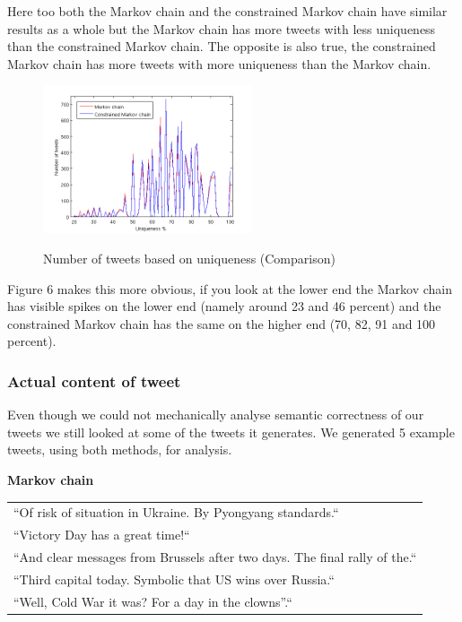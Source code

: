 \documentclass[a4paper,12pt]{article}
\begin{document}
 Here too both the Markov chain and the constrained Markov chain have similar results as a whole but the Markov chain has more tweets with less uniqueness than the constrained Markov chain. The opposite is also true, the constrained Markov chain has more tweets with more uniqueness than the Markov chain.
 
  \begin{figure}[h!]
   \hfill
  {\includegraphics[width=1\linewidth, height = 165]{NumTweetsByUniq2.png}}
  \hfill
  \caption{Number of tweets based on uniqueness (Comparison)}
 \end{figure}

Figure 6 makes this more obvious, if you look at the lower end the Markov chain has visible spikes on the lower end (namely around 23 and 46 percent) and the constrained Markov chain has the same on the higher end (70, 82, 91 and 100 percent).

\subsubsection{Actual content of tweet}
Even though we could not mechanically analyse semantic correctness of our tweets we still looked at some of the tweets it generates. We generated 5 example tweets, using both methods, for analysis.

\textbf{Markov chain}

\begin{tabular}{l}
``Of risk of situation in Ukraine. By Pyongyang standards.``\\
``Victory Day has a great time!\hspace{0 cm}``\\
``And clear messages from Brussels after two days. The final rally of the.``\\
``Third capital today. Symbolic that US wins over Russia.``\\
``Well, Cold War it was? For a day in the clowns''.``
\end{tabular}
\end{document}
